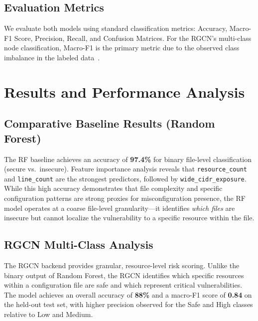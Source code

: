 \documentclass[conference]{IEEEtran}
\begin{document}
\subsection{Evaluation Metrics}

We evaluate both models using standard classification metrics: Accuracy, Macro-F1 Score, Precision, Recall, and Confusion Matrices. For the RGCN's multi-class node classification, Macro-F1 is the primary metric due to the observed class imbalance in the labeled data~\cite{agyemang2023}.

\section{Results and Performance Analysis}

\subsection{Comparative Baseline Results (Random Forest)}

The RF baseline achieves an accuracy of \textbf{97.4\%} for binary file-level classification (secure vs.\ insecure). Feature importance analysis reveals that \texttt{resource\_count} and \texttt{line\_count} are the strongest predictors, followed by \texttt{wide\_cidr\_exposure}. While this high accuracy demonstrates that file complexity and specific configuration patterns are strong proxies for misconfiguration presence, the RF model operates at a coarse file-level granularity---it identifies \textit{which files} are insecure but cannot localize the vulnerability to a specific resource within the file.


\subsection{RGCN Multi-Class Analysis}

The RGCN backend provides granular, resource-level risk scoring. Unlike the binary output of Random Forest, the RGCN identifies which specific resources within a configuration file are safe and which represent critical vulnerabilities. The model achieves an overall accuracy of \textbf{88\%} and a macro-F1 score of \textbf{0.84} on the held-out test set, with higher precision observed for the Safe and High classes relative to Low and Medium.
\end{document}
